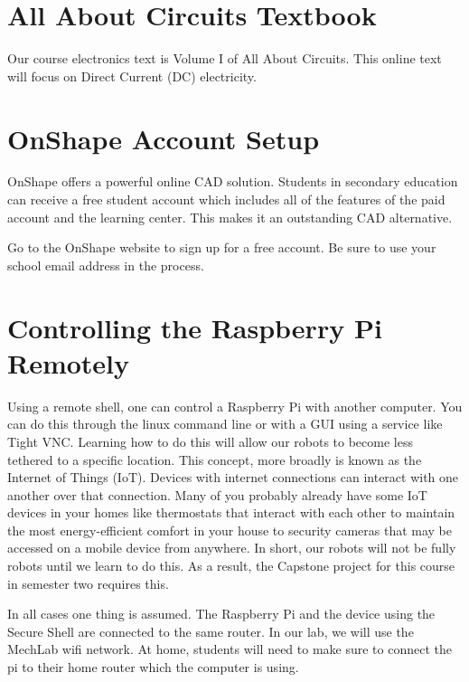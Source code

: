 \documentclass[
]{book}
\begin{document}
\hypertarget{all-about-circuits-textbook}{%
\section{All About Circuits Textbook}\label{all-about-circuits-textbook}}

Our course electronics text is Volume I of All About Circuits. This online text will focus on Direct Current (DC) electricity.

\hypertarget{onshape-account-setup}{%
\section{OnShape Account Setup}\label{onshape-account-setup}}

OnShape offers a powerful online CAD solution. Students in secondary education can receive a free student account which includes all of the features of the paid account and the learning center. This makes it an outstanding CAD alternative.

Go to the OnShape website to sign up for a free account. Be sure to use your school email address in the process.

\hypertarget{controlling-the-raspberry-pi-remotely}{%
\section{Controlling the Raspberry Pi Remotely}\label{controlling-the-raspberry-pi-remotely}}

Using a remote shell, one can control a Raspberry Pi with another computer. You can do this through the linux command line or with a GUI using a service like Tight VNC. Learning how to do this will allow our robots to become less tethered to a specific location. This concept, more broadly is known as the Internet of Things (IoT). Devices with internet connections can interact with one another over that connection. Many of you probably already have some IoT devices in your homes like thermostats that interact with each other to maintain the most energy-efficient comfort in your house to security cameras that may be accessed on a mobile device from anywhere. In short, our robots will not be fully robots until we learn to do this. As a result, the Capstone project for this course in semester two requires this.

In all cases one thing is assumed. The Raspberry Pi and the device using the Secure Shell are connected to the same router. In our lab, we will use the MechLab wifi network. At home, students will need to make sure to connect the pi to their home router which the computer is using.
\end{document}

